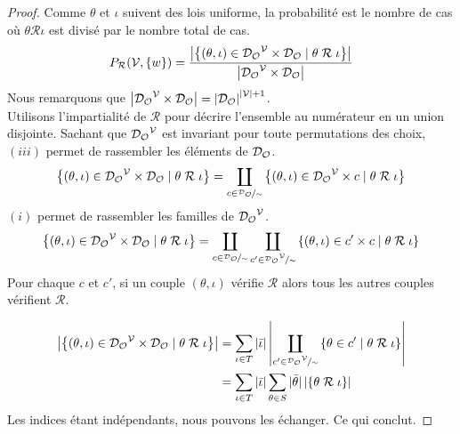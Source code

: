 \begin{proof}
	Comme $\theta$ et $\iota$ suivent des lois uniforme, la probabilité est le nombre de cas où $\theta \mathcal{R} \iota$ est divisé par le nombre total de cas.
	\begin{equation*}
		P_\mathcal{R} (\mathcal{V}, \{w\}) =
		\frac{ \left| \left\{
			(\theta, \iota) \in {\mathcal{D}_\mathcal{O}}^{\mathcal{V}} \times \mathcal{D}_\mathcal{O}
			\;|\; \theta \;\mathcal{R}\; \iota
		\right\} \right| }{ \left|
			{\mathcal{D}_\mathcal{O}}^{\mathcal{V}} \times \mathcal{D}_\mathcal{O}
		\right| }
	\end{equation*}
	Nous remarquons que $\left| {\mathcal{D}_\mathcal{O}}^{\mathcal{V}} \times \mathcal{D}_\mathcal{O} \right| = \left|\mathcal{D}_\mathcal{O}\right| ^ {\left|\mathcal{V}\right| + 1}$. \\
	Utilisons l’impartialité de $\mathcal{R}$ pour décrire l'ensemble au numérateur en un union disjointe.
	Sachant que ${\mathcal{D}_\mathcal{O}}^{\mathcal{V}}$ est invariant pour toute permutations des choix, $(iii)$ permet de rassembler les éléments de $\mathcal{D}_\mathcal{O}$.
	\begin{equation*}
		\left\{ (\theta, \iota) \in {\mathcal{D}_\mathcal{O}}^{\mathcal{V}} \times \mathcal{D}_\mathcal{O} \;|\; \theta \;\mathcal{R}\; \iota \right\}
		= \coprod_{c \in \nicefrac{\mathcal{D}_\mathcal{O}}{\sim}}
		\left\{ (\theta, \iota) \in {\mathcal{D}_\mathcal{O}}^{\mathcal{V}} \times c \;|\; \theta \;\mathcal{R}\; \iota \right\}
	\end{equation*}
	$(i)$ permet de rassembler les familles de ${\mathcal{D}_\mathcal{O}}^{\mathcal{V}}$.
	\begin{equation*}
		\left\{ (\theta, \iota) \in {\mathcal{D}_\mathcal{O}}^{\mathcal{V}} \times \mathcal{D}_\mathcal{O} \;|\; \theta \;\mathcal{R}\; \iota \right\}
		= \coprod_{c \in \nicefrac{\mathcal{D}_\mathcal{O}}{\sim}}
		\coprod_{c' \in \nicefrac{{\mathcal{D}_\mathcal{O}}^{\mathcal{V}}}{\sim}}
		\left\{ (\theta, \iota) \in c' \times c \;|\; \theta \;\mathcal{R}\; \iota \right\}
	\end{equation*}
	Pour chaque $c$ et $c'$, si un couple $(\theta, \iota)$ vérifie $\mathcal{R}$ alors tous les autres couples vérifient $\mathcal{R}$.
	
	\begin{equation*}
		\begin{aligned}
			\left| \left\{ (\theta, \iota) \in {\mathcal{D}_\mathcal{O}}^{\mathcal{V}} \times \mathcal{D}_\mathcal{O} \;|\; \theta \;\mathcal{R}\; \iota \right\} \right|
			&= \sum_{\iota \in T} |\bar{\iota}|
			\left| \coprod_{c' \in \nicefrac{{\mathcal{D}_\mathcal{O}}^{\mathcal{V}}}{\sim}}
			\left\{ \theta \in c' \;|\; \theta \;\mathcal{R}\; \iota \right\} \right| \\
			&= \sum_{\iota \in T} |\bar{\iota}|
			\sum_{\theta \in S}  |\bar{\theta}|
			\left| \left\{ \theta \;\mathcal{R}\; \iota \right\} \right|
		\end{aligned}
	\end{equation*}
	Les indices étant indépendants, nous pouvons les échanger. Ce qui conclut.
\end{proof}

